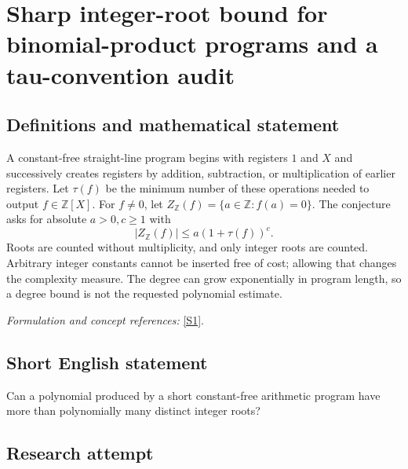 \documentclass[11pt,a4paper]{article}
\newcommand{\Z}{\mathbb{Z}}
\newcommand{\sref}[2]{\hyperlink{source:#1:#2}{[S#2]}}
\newif\ifshowcatalogue
\newcommand{\cataloguescope}[1]{\ifshowcatalogue
 \paragraph{Exact scope in the supplied catalogue.}
 \begin{quote}\small #1\end{quote}\fi}
\numberwithin{equation}{section}
\begin{document}
\setcounter{section}{0}
\clearpage
\section*{\texorpdfstring{Sharp integer-root bound for binomial-product programs and a tau-convention audit}{Sharp integer-root bound for binomial-product programs and a tau-convention audit}}\label{20002353}
\subsection{Definitions and mathematical statement}
A constant-free straight-line program begins with registers $1$ and $X$ and successively creates registers by addition, subtraction, or multiplication of earlier registers. Let $\tau(f)$ be the minimum number of these operations needed to output $f\in\Z[X]$. For $f\ne0$, let $Z_{\Z}(f)=\{a\in\Z:f(a)=0\}$. The conjecture asks for absolute $a>0,c\ge1$ with
\[
 |Z_{\Z}(f)|\le a(1+\tau(f))^c.
\]
Roots are counted without multiplicity, and only integer roots are counted. Arbitrary integer constants cannot be inserted free of cost; allowing that changes the complexity measure. The degree can grow exponentially in program length, so a degree bound is not the requested polynomial estimate.
\par\smallskip\textit{Formulation and concept references:} \sref{20002353}{1}.
\cataloguescope{Determine whether universal constants a > 0 and c >= 1 exist such that every nonzero polynomial f in Z[x] has at most a(1 + tau(f))\textasciicircum{}c distinct integer zeros, where tau(f) is the shortest constant-free straight-line-program length using addition, subtraction, and multiplication, starting from 1 and x.}
\subsection{Short English statement}
Can a polynomial produced by a short constant-free arithmetic program have more than polynomially many distinct integer roots?
\subsection{Research attempt}
\end{document}
